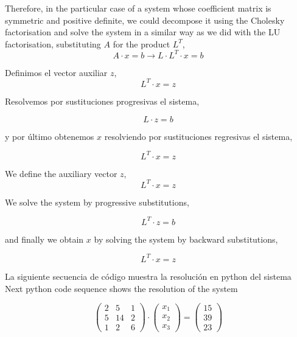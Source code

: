 \begin{paracol}{2}
Therefore, in the particular case of a system whose coefficient matrix is symmetric and positive definite, we could decompose it using the Cholesky factorisation and solve the system in a similar way as we did with the LU factorisation, substituting $A$ for the product $L^T$,
\begin{equation*}
A\cdot x = b \rightarrow L\cdot L^T\cdot x= b
\end{equation*}

\switchcolumn
Definimos el vector auxiliar $z$,
\begin{equation*}
L^T\cdot x= z
\end{equation*}

Resolvemos por sustituciones progresivas el sistema,

\begin{equation*}
L\cdot z=b
\end{equation*}

y por último obtenemos $x$ resolviendo por sustituciones regresivas el sistema,

\begin{equation*}
L^T\cdot x=z
\end{equation*}

\switchcolumn
We define the auxiliary vector $z$,
\begin{equation*}
L^T\cdot x= z
\end{equation*}

We solve the system by progressive substitutions,

\begin{equation*}
L^T\cdot z=b
\end{equation*}

and finally we obtain $x$ by solving the system by backward substitutions,

\begin{equation*}
L^T\cdot x=z
\end{equation*}

\switchcolumn
La siguiente secuencia de código muestra la resolución en python del sistema
\switchcolumn
Next python code sequence shows the resolution of the system 
\end{paracol}
\begin{equation*}
\begin{pmatrix}
2& 5& 1\\
5& 14& 2\\
1& 2& 6
\end{pmatrix}\cdot \begin{pmatrix}
x_1\\
x_2\\
x_3
\end{pmatrix}=\begin{pmatrix}
15\\
39\\
23
\end{pmatrix}
\end{equation*}

